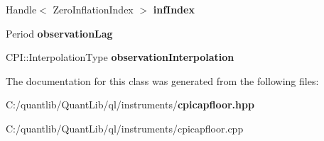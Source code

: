 \begin{DoxyCompactItemize}
\item 
Handle$<$ Zero\+Inflation\+Index $>$ {\bfseries inf\+Index}\label{class_quant_lib_1_1_c_p_i_cap_floor_1_1arguments_a7a4389ca5d78e66fdbf7400415c5fe50}

\item 
Period {\bfseries observation\+Lag}\label{class_quant_lib_1_1_c_p_i_cap_floor_1_1arguments_a5a73aea53e1214fc10bbfc11f4464fa1}

\item 
C\+P\+I\+::\+Interpolation\+Type {\bfseries observation\+Interpolation}\label{class_quant_lib_1_1_c_p_i_cap_floor_1_1arguments_aa0c9899ada0fa81dbac6b3d023535358}

\end{DoxyCompactItemize}


The documentation for this class was generated from the following files\+:\begin{DoxyCompactItemize}
\item 
C\+:/quantlib/\+Quant\+Lib/ql/instruments/{\bf cpicapfloor.\+hpp}\item 
C\+:/quantlib/\+Quant\+Lib/ql/instruments/cpicapfloor.\+cpp\end{DoxyCompactItemize}

